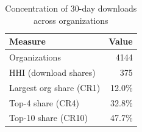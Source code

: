 \begin{table}[t]
\caption{Concentration of 30-day downloads across organizations}
\label{tab:hhi}
\centering
\small
\begin{tabular}{lr}
\toprule
Measure & Value \\
\midrule
Organizations & 4144 \\
HHI (download shares) & 375 \\
Largest org share (CR1) & 12.0\% \\
Top-4 share (CR4) & 32.8\% \\
Top-10 share (CR10) & 47.7\% \\
\bottomrule
\end{tabular}
\normalsize
\end{table}
